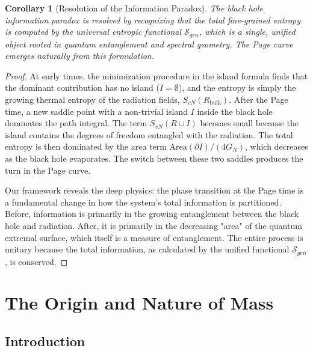 \documentclass[11pt, letterpaper]{report}
\theoremstyle{plain} %
\newtheorem{corollary}[theorem]{Corollary}
\theoremstyle{definition} %
\theoremstyle{remark} %
\begin{document}
\begin{corollary}[Resolution of the Information Paradox]
The black hole information paradox is resolved by recognizing that the total fine-grained entropy is computed by the universal entropic functional $\mathcal{S}_{gen}$, which is a single, unified object rooted in quantum entanglement and spectral geometry. The Page curve emerges naturally from this formulation.
\end{corollary}
\begin{proof}
At early times, the minimization procedure in the island formula finds that the dominant contribution has no island ($I=\emptyset$), and the entropy is simply the growing thermal entropy of the radiation fields, $S_{vN}(R_{\text{bulk}})$. After the Page time, a new saddle point with a non-trivial island $I$ inside the black hole dominates the path integral. The term $S_{vN}(R \cup I)$ becomes small because the island contains the degrees of freedom entangled with the radiation. The total entropy is then dominated by the area term $\text{Area}(\partial I)/(4G_N)$, which decreases as the black hole evaporates. The switch between these two saddles produces the turn in the Page curve.

Our framework reveals the deep physics: the phase transition at the Page time is a fundamental change in how the system's total information is partitioned. Before, information is primarily in the growing entanglement between the black hole and radiation. After, it is primarily in the decreasing "area" of the quantum extremal surface, which itself is a measure of entanglement. The entire process is unitary because the total information, as calculated by the unified functional $\mathcal{S}_{gen}$, is conserved.
\end{proof}













\chapter{The Origin and Nature of Mass}
\label{chap:origin_of_mass}

\section{Introduction}
\label{sec:mass_intro}
\end{document}
